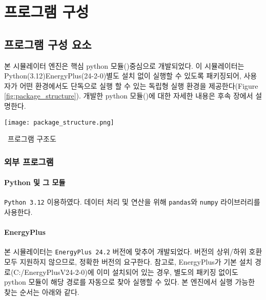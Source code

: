 \part{프로그램 구성}
\label{part:ioref}


\chapter{프로그램 구성 요소}
본 시뮬레이터 엔진은 핵심 python 모듈(\pymodule)\을 중심으로 개발되었다. 이 시뮬레이터는 Python(3.12)\cite{python312}\과 EnergyPlus(24-2-0)\cite{energyplus242}\를 별도 설치 없이 실행할 수 있도록 패키징되어, 사용자가 어떤 환경에서도 단독으로 실행 할 수 있는 독립형 실행 환경을 제공한다(Figure \ref{fig:package_structure}). 개발한 python 모듈(\pymodule)에 대한 자세한 내용은 후속 장에서 설명한다.

\begin{defaultfigure}
  \texttt{[image: package\_structure.png]}
  \caption{\simulator\ 프로그램 구조도}
  \label{fig:package_structure}
\end{defaultfigure}

\section{외부 프로그램}


\subsection{Python 및 그 모듈}
\texttt{Python 3.12} 이용하였다.
데이터 처리 및 연산을 위해 \texttt{pandas}와 \texttt{numpy} 라이브러리를 사용한다.

\subsection{EnergyPlus}
본 시뮬레이터는 \texttt{EnergyPlus 24.2} 버전에 맞추어 개발되었다.  버전의 상위/하위 호환 모두 지원하지 않으므로, 정확한 버전의  요구한다.
참고로, EnergyPlus가 기본 설치 경로(C:/EnergyPlusV24-2-0)에 이미 설치되어 있는 경우, 별도의 패키징 없이도 python 모듈이 해당 경로를 자동으로 찾아 실행할 수 있다. 본 엔진에서 실행 가능한 \ep 찾는 순서는 아래와 같다.

